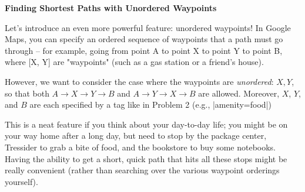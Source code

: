 \item {\bf Finding Shortest Paths with Unordered Waypoints}

Let's introduce an even more powerful feature: unordered waypoints! In Google Maps, you can specify an ordered sequence of waypoints that a path must go through – for example, going from point A to point X to point Y to point B, where [X, Y] are "waypoints" (such as a gas station or a friend's house).

However, we want to consider the case where the waypoints are \textit{unordered}: ${X, Y}$, so that both $A \rightarrow X \rightarrow Y \rightarrow B$ and $A \rightarrow Y \rightarrow X \rightarrow B$ are allowed. Moreover, $X$, $Y$, and $B$ are each specified by a tag like in Problem 2 (e.g., |amenity=food|)

This is a neat feature if you think about your day-to-day life; you might be on your way home after a long day, but need to stop by the package center, Tressider to grab a bite of food, and the bookstore to buy some notebooks. Having the ability to get a short, quick path that hits all these stops might be really convenient (rather than searching over the various waypoint orderings yourself).

\begin{enumerate}

  

  

  

\end{enumerate}
